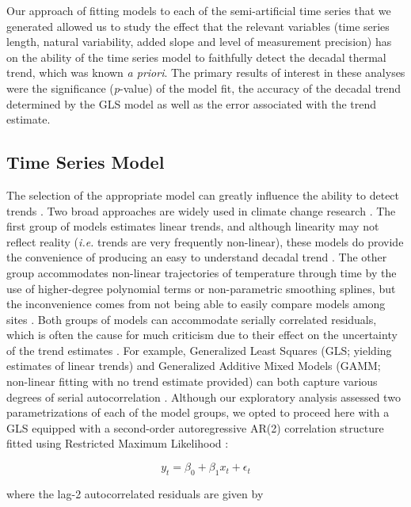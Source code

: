 \documentclass[]{ametsoc}
\begin{document}
Our approach of fitting models to each of the semi-artificial time series that we generated allowed us to study the effect that the relevant variables (time series length, natural variability, added slope and level of measurement precision) has on the ability of the time series model to faithfully detect the decadal thermal trend, which was known \emph{a priori}. The primary results of interest in these analyses were the significance (\emph{p}-value) of the model fit, the accuracy of the decadal trend determined by the GLS model as well as the error associated with the trend estimate.

\subsection{Time Series Model}
The selection of the appropriate model can greatly influence the ability to detect trends \citep{Franzke2012}. Two broad approaches are widely used in climate change research \citep{IPCC2013}. The first group of models estimates linear trends, and although linearity may not reflect reality (\emph{i.e.} trends are very frequently non-linear), these models do provide the convenience of producing an easy to understand decadal trend \citep[\emph{e.g.} \SI{0.106}{\degreeCelsius}~dec$^{-1}$;][]{Wilks2011,IPCC2013}. The other group accommodates non-linear trajectories of temperature through time by the use of higher-degree polynomial terms or non-parametric smoothing splines, but the inconvenience comes from not being able to easily compare models among sites \citep{Wood2006,Scinocca2010}. Both groups of models can accommodate serially correlated residuals, which is often the cause for much criticism due to their effect on the uncertainty of the trend estimates \citep{vonStorch1999,Santer2008}. For example, Generalized Least Squares (GLS; yielding estimates of linear trends) and Generalized Additive Mixed Models (GAMM; non-linear fitting with no trend estimate provided) can both capture various degrees of serial autocorrelation \citep{pinheiro2006mixed,Wood2006}. Although our exploratory analysis assessed two parametrizations of each of the model groups, we opted to proceed here with a GLS equipped with a second-order autoregressive AR(2) correlation structure fitted using Restricted Maximum Likelihood \citep[REML;][]{pinheiro2006mixed}:

$$y_{t} = \beta_{0} + \beta_{1}x_{t} + \epsilon_{t}$$

where the lag-2 autocorrelated residuals are given by
\end{document}
